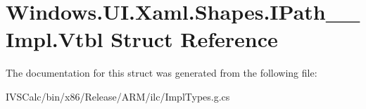 \hypertarget{struct_windows_1_1_u_i_1_1_xaml_1_1_shapes_1_1_i_path_____impl_1_1_vtbl}{}\section{Windows.\+U\+I.\+Xaml.\+Shapes.\+I\+Path\+\_\+\+\_\+\+Impl.\+Vtbl Struct Reference}
\label{struct_windows_1_1_u_i_1_1_xaml_1_1_shapes_1_1_i_path_____impl_1_1_vtbl}


The documentation for this struct was generated from the following file\+:\begin{DoxyCompactItemize}
\item 
I\+V\+S\+Calc/bin/x86/\+Release/\+A\+R\+M/ilc/Impl\+Types.\+g.\+cs\end{DoxyCompactItemize}
